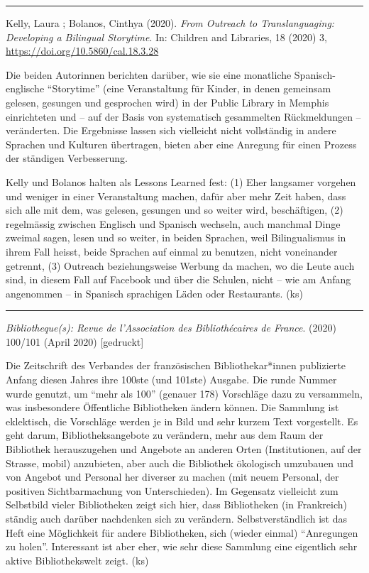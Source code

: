\documentclass[a4paper,
fontsize=11pt,
oneside,
numbers=noperiodatend,
parskip=half-,
bibliography=totoc,
final
]{scrartcl}
\begin{document}
\begin{center}\rule{0.5\linewidth}{0.5pt}\end{center}

Kelly, Laura ; Bolanos, Cinthya (2020). \emph{From Outreach to
Translanguaging: Developing a Bilingual Storytime}. In: Children and
Libraries, 18 (2020) 3, \url{https://doi.org/10.5860/cal.18.3.28}

Die beiden Autorinnen berichten darüber, wie sie eine monatliche
Spanisch-englische \enquote{Storytime} (eine Veranstaltung für Kinder,
in denen gemeinsam gelesen, gesungen und gesprochen wird) in der Public
Library in Memphis einrichteten und -- auf der Basis von systematisch
gesammelten Rückmeldungen -- veränderten. Die Ergebnisse lassen sich
vielleicht nicht vollständig in andere Sprachen und Kulturen übertragen,
bieten aber eine Anregung für einen Prozess der ständigen Verbesserung.

Kelly und Bolanos halten als Lessons Learned fest: (1) Eher langsamer
vorgehen und weniger in einer Veranstaltung machen, dafür aber mehr Zeit
haben, dass sich alle mit dem, was gelesen, gesungen und so weiter wird,
beschäftigen, (2) regelmässig zwischen Englisch und Spanisch wechseln,
auch manchmal Dinge zweimal sagen, lesen und so weiter, in beiden
Sprachen, weil Bilingualismus in ihrem Fall heisst, beide Sprachen auf
einmal zu benutzen, nicht voneinander getrennt, (3) Outreach
beziehungsweise Werbung da machen, wo die Leute auch sind, in diesem
Fall auf Facebook und über die Schulen, nicht -- wie am Anfang
angenommen -- in Spanisch sprachigen Läden oder Restaurants. (ks)

\begin{center}\rule{0.5\linewidth}{0.5pt}\end{center}

\emph{Bibliotheque(s): Revue de l'Association des Bibliothécaires de
France}. (2020) 100/101 (April 2020) {[}gedruckt{]}

Die Zeitschrift des Verbandes der französischen Bibliothekar*innen
publizierte Anfang diesen Jahres ihre 100ste (und 101ste) Ausgabe. Die
runde Nummer wurde genutzt, um \enquote{mehr als 100} (genauer 178)
Vorschläge dazu zu versammeln, was insbesondere Öffentliche Bibliotheken
ändern können. Die Sammlung ist eklektisch, die Vorschläge werden je in
Bild und sehr kurzem Text vorgestellt. Es geht darum,
Bibliotheksangebote zu verändern, mehr aus dem Raum der Bibliothek
herauszugehen und Angebote an anderen Orten (Institutionen, auf der
Strasse, mobil) anzubieten, aber auch die Bibliothek ökologisch
umzubauen und von Angebot und Personal her diverser zu machen (mit neuem
Personal, der positiven Sichtbarmachung von Unterschieden). Im Gegensatz
vielleicht zum Selbstbild vieler Bibliotheken zeigt sich hier, dass
Bibliotheken (in Frankreich) ständig auch darüber nachdenken sich zu
verändern. Selbstverständlich ist das Heft eine Möglichkeit für andere
Bibliotheken, sich (wieder einmal) \enquote{Anregungen zu holen}.
Interessant ist aber eher, wie sehr diese Sammlung eine eigentlich sehr
aktive Bibliothekswelt zeigt. (ks)
\end{document}
